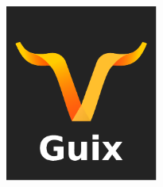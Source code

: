 \documentclass[bigger]{beamer}
\begin{document}
\begin{frame}[label={sec:org013e54c}]{⁤}
\begin{center}
\includegraphics[height=220]{./Guix Logo.pdf}
\end{center}
\end{frame}
\end{document}
